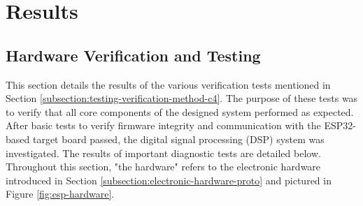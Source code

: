 \chapter{Results}
\label{chapter:results}

\graphicspath{ {report/C6 Results/assets/} } 


\section{Hardware Verification and Testing}
This section details the results of the various verification tests mentioned in Section \ref{subsection:testing-verification-method-c4}. The purpose of these tests was to verify that all core components of the designed system performed as expected. After basic tests to verify firmware integrity and communication with the ESP32-based target board passed, the digital signal processing (DSP) system was investigated. The results of important diagnostic tests are detailed below. Throughout this section, "the hardware" refers to the electronic hardware introduced in Section \ref{subsection:electronic-hardware-proto} and pictured in Figure \ref{fig:esp-hardware}.


